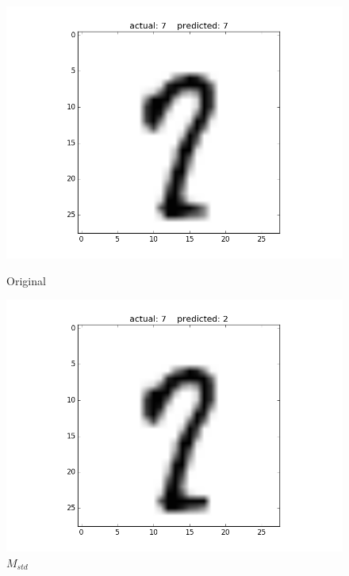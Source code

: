 \documentclass{article}
\begin{document}
\begin{figure}[h!]
	\begin{minipage}{0.5\textwidth}
		\centering
		\includegraphics[width=\textwidth]{O.png}
		\caption{Original}
	\end{minipage} \hfill
	\begin{minipage}{0.5\textwidth}
		\centering
		\includegraphics[width=\textwidth]{S.png}
		\caption{$M_{std}$}
	\end{minipage} 
	\begin{minipage}{0.5\textwidth}
		\centering

\end{minipage}
\end{figure}
\end{document}

